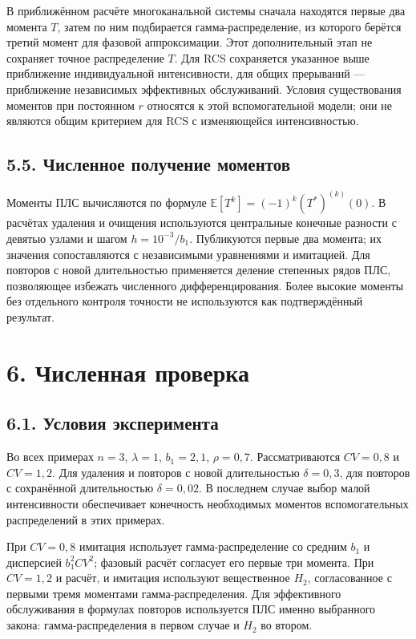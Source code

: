 В приближённом расчёте многоканальной системы сначала находятся первые два момента \(T\), затем по ним подбирается гамма-распределение, из которого берётся третий момент для фазовой аппроксимации. Этот дополнительный этап не сохраняет точное распределение \(T.\) Для RCS сохраняется указанное выше приближение индивидуальной интенсивности, для общих прерываний --- приближение независимых эффективных обслуживаний. Условия существования моментов при постоянном \(r\) относятся к этой вспомогательной модели; они не являются общим критерием для RCS с изменяющейся интенсивностью.

\subsection*{5.5. Численное получение моментов}
Моменты ПЛС вычисляются по формуле \(\mathbb E[T^k]=(-1)^k(T^*)^{(k)}(0).\) В расчётах удаления и очищения используются центральные конечные разности с девятью узлами и шагом \(h=10^{-3}/b_1.\) Публикуются первые два момента; их значения сопоставляются с независимыми уравнениями и имитацией. Для повторов с новой длительностью применяется деление степенных рядов ПЛС, позволяющее избежать численного дифференцирования. Более высокие моменты без отдельного контроля точности не используются как подтверждённый результат.

\section*{6. Численная проверка}
\subsection*{6.1. Условия эксперимента}
Во всех примерах \(n=3\), \(\lambda=1\), \(b_1=2{,}1\), \(\rho=0{,}7.\) Рассматриваются \(CV=0{,}8\) и \(CV=1{,}2.\) Для удаления и повторов с новой длительностью \(\delta=0{,}3\), для повторов с сохранённой длительностью \(\delta=0{,}02.\) В последнем случае выбор малой интенсивности обеспечивает конечность необходимых моментов вспомогательных распределений в этих примерах.

При \(CV=0{,}8\) имитация использует гамма-распределение со средним \(b_1\) и дисперсией \(b_1^2CV^2\); фазовый расчёт согласует его первые три момента. При \(CV=1{,}2\) и расчёт, и имитация используют вещественное \(H_2\), согласованное с первыми тремя моментами гамма-распределения. Для эффективного обслуживания в формулах повторов используется ПЛС именно выбранного закона: гамма-распределения в первом случае и \(H_2\) во втором.

